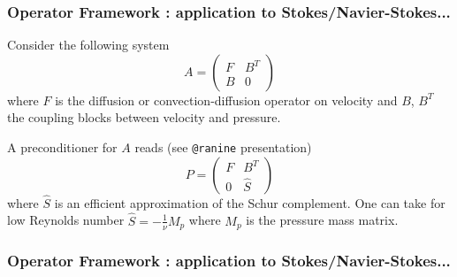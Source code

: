 \begin{frame}[fragile]
  \frametitle{Operator Framework : application to Stokes/Navier-Stokes...}
  Consider the following system
  \begin{equation}
    \label{eq:1}
    A = \begin{pmatrix}
      F & B^T\\
      B & 0
    \end{pmatrix}
  \end{equation}
  where $F$ is the diffusion or convection-diffusion operator on
  velocity and $B$, $B^T$ the coupling blocks between velocity and
  pressure.

  A preconditioner for
  $A$ reads (see \texttt{@ranine} presentation)
  \begin{equation}
    \label{eq:2}
    P = \begin{pmatrix}
      F & B^T\\
      0 & \hat{S}
    \end{pmatrix}
  \end{equation}
  where $\hat{S}$ is an efficient approximation of the Schur
  complement. One can take for low Reynolds number
  $\hat{S}=-\frac{1}{\nu}M_p$ where $M_p$ is the pressure mass matrix.
\end{frame}
\begin{frame}[fragile]
  \frametitle{Operator Framework : application to Stokes/Navier-Stokes...}
  \inputminted[fontsize=\scriptsize,autogobble,mathescape]{c++}{Codes/prudhomme/fud4/op.cpp}
\end{frame}

